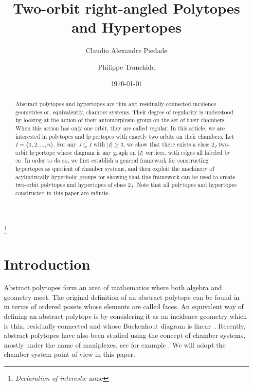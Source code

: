 \documentclass[11pt,letterpaper]{amsart}
\begin{document}
\title{Two-orbit right-angled Polytopes and Hypertopes}



\author[Claudio Alexandre Piedade]{Claudio Alexandre Piedade}
\address[Claudio Alexandre Piedade]{Université Libre de Bruxelles, Brussels, Belgium
}

\author[Philippe Tranchida]{Philippe Tranchida}
\address[Philippe Tranchida]{Université Libre de Bruxelles, Brussels, Belgium
}

\setcounter{tocdepth}{1}

\thanks{\textit{Declaration of interests:} none}
\date{\today}


\begin{abstract}
    Abstract polytopes and hypertopes are thin and residually-connected incidence geometries or, equivalently, chamber systems. Their degree of regularity is understood by looking at the action of their automorphism group on the set of their chambers. When this action has only one orbit, they are called regular. In this article, we are interested in polytopes and hypertopes with exactly two orbits on their chambers. Let $I = \{1,2,\ldots,n\}$. For any $J\subsetneq I$ with $|I| \geq 3$, we show that there exists a class $2_J$ two-orbit hypertope whose diagram is any graph on $|I|$ vertices, with edges all labeled by $\infty$. In order to do so, we first establish a general framework for constructing hypertopes as quotient of chamber systems, and then exploit the machinery of acylindrically hyperbolic groups for showing that this framework can be used to create two-orbit polytopes and hypertopes of class $2_J$. Note that all polytopes and hypertopes constructed in this paper are infinite.
 
\end{abstract}
    

\maketitle
\section{Introduction}

Abstract polytopes form an area of mathematics where both algebra and geometry meet. The original definition of an abstract polytope can be found in~\cite{ARP} in terms of ordered posets whose elements are called faces. 
An equivalent way of defining an abstract polytope is by considering it as an incidence geometry which is thin, residually-connected and whose Buekenhout diagram is linear~\cite{buekenhout2013diagram}.
Recently, abstract polytopes have also been studied using the concept of chamber systems, mostly under the name of maniplexes, see for example \cite{ManiplexesWilson,PolytopalityManiplexes, SymmetryTypeGraph}. We will adopt the chamber system point of view in this paper.
\end{document}
